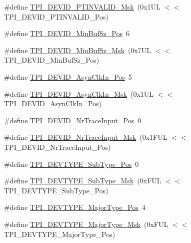 \begin{DoxyCompactItemize}
\item 
\#define \hyperlink{group__CMSIS__TPI_ga1ca84d62243e475836bba02516ba6b97}{T\-P\-I\-\_\-\-D\-E\-V\-I\-D\-\_\-\-P\-T\-I\-N\-V\-A\-L\-I\-D\-\_\-\-Msk}~(0x1\-U\-L $<$$<$ T\-P\-I\-\_\-\-D\-E\-V\-I\-D\-\_\-\-P\-T\-I\-N\-V\-A\-L\-I\-D\-\_\-\-Pos)
\item 
\#define \hyperlink{group__CMSIS__TPI_ga3f7da5de2a34be41a092e5eddd22ac4d}{T\-P\-I\-\_\-\-D\-E\-V\-I\-D\-\_\-\-Min\-Buf\-Sz\-\_\-\-Pos}~6
\item 
\#define \hyperlink{group__CMSIS__TPI_ga939e068ff3f1a65b35187ab34a342cd8}{T\-P\-I\-\_\-\-D\-E\-V\-I\-D\-\_\-\-Min\-Buf\-Sz\-\_\-\-Msk}~(0x7\-U\-L $<$$<$ T\-P\-I\-\_\-\-D\-E\-V\-I\-D\-\_\-\-Min\-Buf\-Sz\-\_\-\-Pos)
\item 
\#define \hyperlink{group__CMSIS__TPI_gab382b1296b5efd057be606eb8f768df8}{T\-P\-I\-\_\-\-D\-E\-V\-I\-D\-\_\-\-Asyn\-Clk\-In\-\_\-\-Pos}~5
\item 
\#define \hyperlink{group__CMSIS__TPI_gab67830557d2d10be882284275025a2d3}{T\-P\-I\-\_\-\-D\-E\-V\-I\-D\-\_\-\-Asyn\-Clk\-In\-\_\-\-Msk}~(0x1\-U\-L $<$$<$ T\-P\-I\-\_\-\-D\-E\-V\-I\-D\-\_\-\-Asyn\-Clk\-In\-\_\-\-Pos)
\item 
\#define \hyperlink{group__CMSIS__TPI_ga80ecae7fec479e80e583f545996868ed}{T\-P\-I\-\_\-\-D\-E\-V\-I\-D\-\_\-\-Nr\-Trace\-Input\-\_\-\-Pos}~0
\item 
\#define \hyperlink{group__CMSIS__TPI_gabed454418d2140043cd65ec899abd97f}{T\-P\-I\-\_\-\-D\-E\-V\-I\-D\-\_\-\-Nr\-Trace\-Input\-\_\-\-Msk}~(0x1\-F\-U\-L $<$$<$ T\-P\-I\-\_\-\-D\-E\-V\-I\-D\-\_\-\-Nr\-Trace\-Input\-\_\-\-Pos)
\item 
\#define \hyperlink{group__CMSIS__TPI_ga0c799ff892af5eb3162d152abc00af7a}{T\-P\-I\-\_\-\-D\-E\-V\-T\-Y\-P\-E\-\_\-\-Sub\-Type\-\_\-\-Pos}~0
\item 
\#define \hyperlink{group__CMSIS__TPI_ga5b2fd7dddaf5f64855d9c0696acd65c1}{T\-P\-I\-\_\-\-D\-E\-V\-T\-Y\-P\-E\-\_\-\-Sub\-Type\-\_\-\-Msk}~(0x\-F\-U\-L $<$$<$ T\-P\-I\-\_\-\-D\-E\-V\-T\-Y\-P\-E\-\_\-\-Sub\-Type\-\_\-\-Pos)
\item 
\#define \hyperlink{group__CMSIS__TPI_ga69c4892d332755a9f64c1680497cebdd}{T\-P\-I\-\_\-\-D\-E\-V\-T\-Y\-P\-E\-\_\-\-Major\-Type\-\_\-\-Pos}~4
\item 
\#define \hyperlink{group__CMSIS__TPI_gaecbceed6d08ec586403b37ad47b38c88}{T\-P\-I\-\_\-\-D\-E\-V\-T\-Y\-P\-E\-\_\-\-Major\-Type\-\_\-\-Msk}~(0x\-F\-U\-L $<$$<$ T\-P\-I\-\_\-\-D\-E\-V\-T\-Y\-P\-E\-\_\-\-Major\-Type\-\_\-\-Pos)
\end{DoxyCompactItemize}


